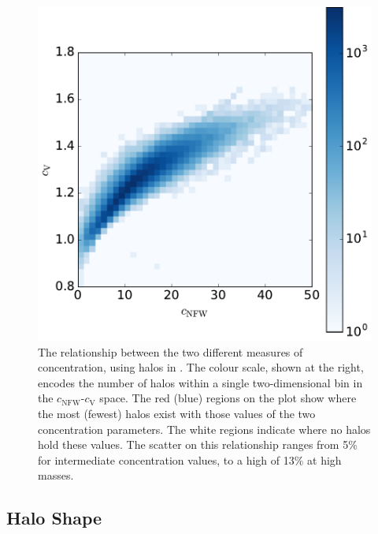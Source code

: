 \documentclass[usenatbib,fleqn]{mnras}
\begin{document}
\begin{figure}
\centering
\includegraphics[width=\columnwidth]{cvvscnfw_relation.pdf}
\caption{
The relationship between the two different measures of concentration, 
using halos in \simB. The colour scale, shown at the right, encodes the number of halos within a single two-dimensional bin in the $c_{\mathrm{NFW}}$-$c_{\mathrm{V}}$ space. The red (blue) regions on the plot show where the most (fewest) halos exist with those values of the two concentration parameters. The white regions indicate where no halos hold these values. The scatter on this relationship ranges from 5\% for intermediate concentration values, to a high of 13\% at high masses.
}
\label{fig:concentrations}
\end{figure}


\subsection{Halo Shape}
\end{document}
